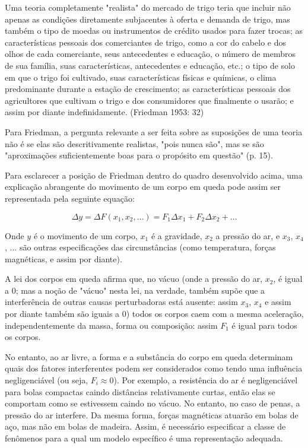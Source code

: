 \documentclass[12pt]{article}
\begin{document}
Uma teoria completamente "realista" do mercado de trigo teria que incluir não apenas as condições diretamente subjacentes à oferta e demanda de trigo, mas também o tipo de moedas ou instrumentos de crédito usados para fazer trocas; as características pessoais dos comerciantes de trigo, como a cor do cabelo e dos olhos de cada comerciante, seus antecedentes e educação, o número de membros de sua família, suas características, antecedentes e educação, etc.; o tipo de solo em que o trigo foi cultivado, suas características físicas e químicas, o clima predominante durante a estação de crescimento; as características pessoais dos agricultores que cultivam o trigo e dos consumidores que finalmente o usarão; e assim por diante indefinidamente.
(Friedman 1953: 32)

Para Friedman, a pergunta relevante a ser feita sobre as suposições de uma teoria não é se elas são descritivamente realistas, "pois nunca são", mas se são "aproximações suficientemente boas para o propósito em questão" (p. 15).

Para esclarecer a posição de Friedman dentro do quadro desenvolvido acima, uma explicação abrangente do movimento de um corpo em queda pode assim ser representada pela seguinte equação:

$$\Delta y = \Delta F(x_1, x_2, \ldots) = F_1 \Delta x_1 + F_2 \Delta x_2 + \ldots$$

Onde $y$ é o movimento de um corpo, $x_1$ é a gravidade, $x_2$ a pressão do ar, e $x_3$, $x_4$, ... são outras especificações das circunstâncias (como temperatura, forças magnéticas, e assim por diante).

A lei dos corpos em queda afirma que, no vácuo (onde a pressão do ar, $x_2$, é igual a 0; mas a noção de "vácuo" nesta lei, na verdade, também supõe que a interferência de outras causas perturbadoras está ausente: assim $x_3$, $x_4$ e assim por diante também são iguais a 0) todos os corpos caem com a mesma aceleração, independentemente da massa, forma ou composição: assim $F_1$ é igual para todos os corpos.

No entanto, ao ar livre, a forma e a substância do corpo em queda determinam quais dos fatores interferentes podem ser considerados como tendo uma influência negligenciável (ou seja, $F_i \approx 0$). Por exemplo, a resistência do ar é negligenciável para bolas compactas caindo distâncias relativamente curtas, então elas se comportam como se estivessem caindo no vácuo. No entanto, no caso de penas, a pressão do ar interfere. Da mesma forma, forças magnéticas atuarão em bolas de aço, mas não em bolas de madeira. Assim, é necessário especificar a classe de fenômenos para a qual um modelo específico é uma representação adequada.
\end{document}
